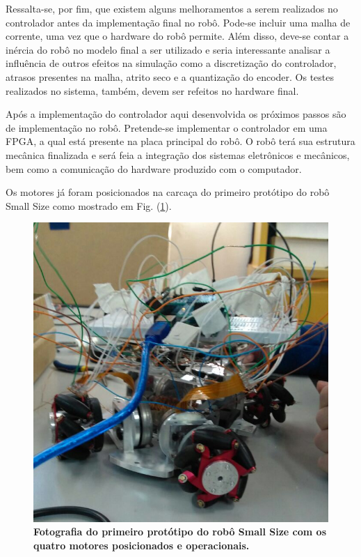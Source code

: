 \documentclass[10pt,fleqn,a4paper]{article}
\begin{document}
    Ressalta-se, por fim, que existem alguns melhoramentos a serem realizados no controlador antes da implementação final no robô. Pode-se incluir uma malha de corrente, uma vez que o hardware do robô permite. Além disso, deve-se contar a inércia do robô no modelo final a ser utilizado e seria interessante analisar a influência de outros efeitos na simulação como a discretização do controlador, atrasos presentes na malha, atrito seco e a quantização do encoder. Os testes realizados no sistema, também, devem ser refeitos no hardware final.
    
    Após a implementação do controlador aqui desenvolvida os próximos passos são de implementação no robô. Pretende-se implementar o controlador em uma FPGA, a qual está presente na placa principal do robô. O robô terá sua estrutura mecânica finalizada e será feia a integração dos sistemas eletrônicos e mecânicos, bem como a comunicação do hardware produzido com o computador.
 
    
    Os motores já foram posicionados na carcaça do primeiro protótipo do robô Small Size como mostrado em Fig. (\ref{fig:smallfoto}).

	\begin{figure}[ht]
		\begin{center}
			\includegraphics[angle=0, scale=0.3]{images/smallfoto}
		\end{center}
		\caption{\textbf{Fotografia do primeiro protótipo do robô Small Size com os quatro motores posicionados e operacionais.}}
		\label{fig:smallfoto}
	\end{figure}
\end{document}
